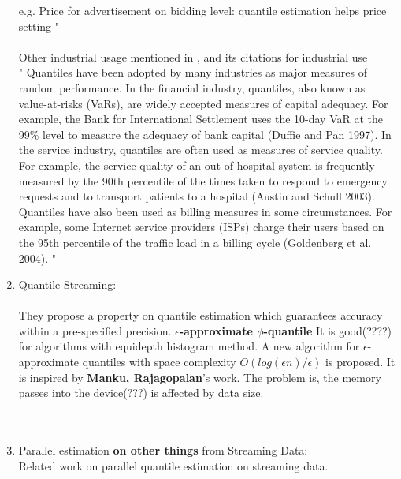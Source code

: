 \documentclass[12pt]{article}
\begin{document}
\begin{enumerate}
        e.g. Price for advertisement on bidding level: quantile estimation helps price setting
        "\\\\
        Other industrial usage mentioned in \cite{hongEstimatingQuantileSensitivities2009}, and its citations for industrial use \\
        "
        Quantiles have been adopted by many industries as major
        measures of random performance. In the financial industry,
        quantiles, also known as value-at-risks (VaRs), are widely
        accepted measures of capital adequacy. For example, the
        Bank for International Settlement uses the 10-day VaR at
        the 99\% level to measure the adequacy of bank capital
        (Duffie and Pan 1997). In the service industry, quantiles
        are often used as measures of service quality. For example, the service quality of an out-of-hospital system is frequently measured by the 90th percentile of the times taken
        to respond to emergency requests and to transport patients
        to a hospital (Austin and Schull 2003). Quantiles have
        also been used as billing measures in some circumstances.
        For example, some Internet service providers (ISPs) charge
        their users based on the 95th percentile of the traffic load
        in a billing cycle (Goldenberg et al. 2004).
        "
    \item Quantile Streaming: \\
        \cite{greenwaldQuantilesEquidepthHistograms2016}\\
        They propose a property on quantile estimation which guarantees accuracy within a pre-specified precision. 
        \textbf{$\epsilon$-approximate $\phi$-quantile}
        It is good(????) for algorithms with equidepth histogram method.
        A new algorithm for $\epsilon$-approximate quantiles with space complexity $O(log(\epsilon n)/\epsilon)$ is proposed. It is inspired by \textbf{Manku, Rajagopalan}'s work. 
         The problem is, the memory passes into the device(???) is affected by data size.
        \\\\
        \cite{maFrugalStreamingEstimating2014}\\
    \pagebreak    
    \item Parallel estimation \textbf{on other things} from Streaming Data: \\
        Related work on parallel quantile estimation on streaming data.




\end{enumerate}
\end{document}
